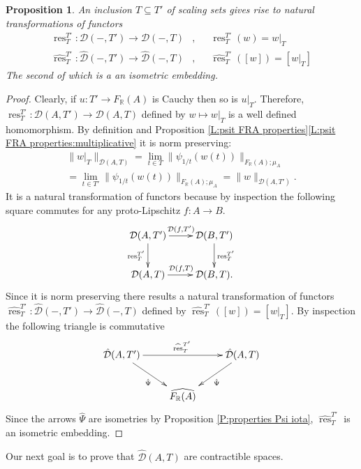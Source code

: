 \documentclass[12pt]{amsart}
\newtheorem{prop}{Proposition}[section]
\theoremstyle{definition}
\def\RR{\ensuremath{\mathbb{R}}}
\def\res{\operatorname{res}}
\newcommand{\C}[1]{\mathcal{#1}}
\def\Free{F}
\def\D{\mathcal{D}}
\def\tD{\hat{\D}}
\begin{document}
\begin{prop}\label{P:naturality tDA at T}
An inclusion $T \subseteq T'$ of scaling sets gives rise to natural transformations of functors 
\begin{align*}
\res^{T'}_T \colon \C D(-,T') \to \C D(-,T)    & ,&  &\res^{T'}_T(w) = w|_T \\
\widehat{\res}^{T'}_T \colon \tD(-,T') \to \tD(-,T)      & ,& & \hat{\res}^{T'}_T([w]) = [w|_T]
\end{align*}
The second of which is a an isometric embedding.
\end{prop}


\begin{proof}
Clearly, if $u \colon T' \to \Free_\RR(A)$ is Cauchy then so is $u|_T$.
Therefore, $\res^{T'}_{T} \colon \C D(A,T') \to \C D(A,T)$ defined by $w \mapsto w|_T$ is a well defined homomorphism.
By definition and Proposition \ref{L:psit FRA properties}\ref{L:psit FRA properties:multiplicative} it is norm preserving:
\begin{multline*}
\| w|_T\|_{\C D(A,T)} 
= \lim_{t \in T} \|\psi_{1/t}(w(t))\|_{\Free_\RR(A);\mu_A} 
 \\
=
\lim_{t \in T'} \|\psi_{1/t}(w(t))\|_{\Free_\RR(A);\mu_A} =
\| w\|_{\C D(A,T')}.
\end{multline*}
It is a natural transformation of functors because by inspection the following square commutes for any proto-Lipschitz $f \colon A \to B$.
\[
\xymatrix{
\C D(A,T') \ar[r]^{\C D(f,T')} \ar[d]_{\res^{T'}_T} &
\C D(B,T') \ar[d]^{\res^{T'}_T} 
\\
\C D(A,T) \ar[r]^{\C D(f,T)} &
\C D(B,T).
}
\]
Since it is norm preserving there results a natural transformation of functors $\widehat{\res}^{T'}_T \colon \tD(-,T') \to \tD(-,T)$ defined by $\widehat{\res}^{T'}_T([w])=[w|_T]$.
By inspection the following triangle is commutative
\[
\xymatrix{
\tD(A,T') \ar[rr]^{\widehat{\res}^{T'}_T} \ar[dr]_{\hat{\Psi}} & &
\tD(A,T) \ar[dl]^{\hat{\Psi}} 
\\
& \widehat{\Free_\RR(A)}
}
\]
Since the arrows $\hat{\Psi}$ are isometries by Proposition \ref{P:properties Psi iota}, $\widehat{\res}^{T'}_T$ is an isometric embedding.
\end{proof}






Our next goal is to prove that $\tD(A,T)$ are contractible spaces.
\end{document}
